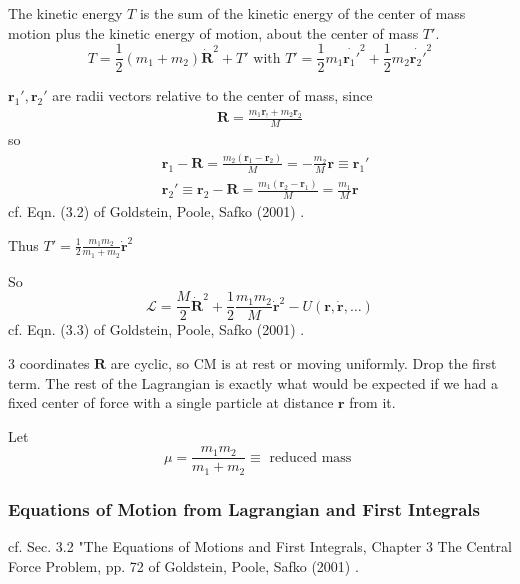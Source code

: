 \documentclass[10pt]{amsart}
\begin{document}
\begin{multicols*}{2}
The kinetic energy $T$ is the sum of the kinetic energy of the center of mass motion plus the kinetic energy of motion, about the center of mass $T'$.
\[
T = \frac{1}{2} (m_1 + m_2) \dot{ \mathbf{R}}^2 + T' \text{ with } T' = \frac{1}{2} m_1 \dot{ \mathbf{r}_1'}^2 + \frac{1}{2} m_2 \dot{\mathbf{r}_2'}^2
\]

$\mathbf{r}_1', \mathbf{r}_2'$ are radii vectors relative to the center of mass, since \\
\[
\begin{gathered}
\mathbf{R} = \frac{m_1 \mathbf{r}_! + m_2 \mathbf{r}_2 }{M}
\end{gathered}
\]
so 
\begin{equation}
\begin{aligned}
& \mathbf{r}_1 - \mathbf{R} = \frac{m_2 (\mathbf{r}_1 - \mathbf{r}_2 )}{ M} = -\frac{m_2}{M} \mathbf{r} \equiv \mathbf{r}_1' \\
&  \mathbf{r}_2' \equiv \mathbf{r}_2 - \mathbf{R} = \frac{m_1(\mathbf{r}_2 - \mathbf{r}_1 )}{ M} = \frac{m_1}{M} \mathbf{r}
\end{aligned}
\end{equation}
cf. Eqn. (3.2) of Goldstein, Poole, Safko (2001) \cite{GPS2001}.

Thus $T' = \frac{1}{2} \frac{m_1 m_2}{m_1 + m_2 } \dot{ \mathbf{r}}^2$

So
\begin{equation}
\mathcal{L} = \frac{M}{2} \dot{\mathbf{R}}^2 + \frac{1}{2} \frac{m_1 m_2}{M} \dot{\mathbf{r}}^2 - U (\mathbf{r}, \dot{\mathbf{r}}, \dots )
\end{equation}
cf. Eqn. (3.3) of Goldstein, Poole, Safko (2001) \cite{GPS2001}.

3 coordinates $\mathbf{R} $ are cyclic, so CM is at rest or moving uniformly. Drop the first term. The rest of the Lagrangian is exactly what would be expected if we had a fixed center of force with a single particle at distance $\mathbf{r}$ from it.

Let 
\[
\mu = \frac{m_1 m_2}{ m _1 + m_2} \equiv \text{ reduced mass }
\]

\subsubsection{Equations of Motion from Lagrangian and First Integrals}

cf. Sec. 3.2 "The Equations of Motions and First Integrals, Chapter 3 The Central Force Problem, pp. 72 of Goldstein, Poole, Safko (2001) \cite{GPS2001}.


\end{multicols*}
\end{document}
